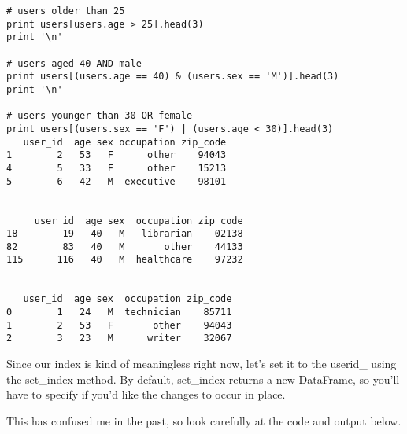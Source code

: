 \documentclass[]{article}
\begin{document}
\begin{framed}
\begin{verbatim}
# users older than 25
print users[users.age > 25].head(3)
print '\n'

# users aged 40 AND male
print users[(users.age == 40) & (users.sex == 'M')].head(3)
print '\n'

# users younger than 30 OR female
print users[(users.sex == 'F') | (users.age < 30)].head(3)
   user_id  age sex occupation zip_code
1        2   53   F      other    94043
4        5   33   F      other    15213
5        6   42   M  executive    98101


     user_id  age sex  occupation zip_code
18        19   40   M   librarian    02138
82        83   40   M       other    44133
115      116   40   M  healthcare    97232


   user_id  age sex  occupation zip_code
0        1   24   M  technician    85711
1        2   53   F       other    94043
2        3   23   M      writer    32067
\end{verbatim}
\end{framed}
Since our index is kind of meaningless right now, let's set it to the userid\_ using the set\_index method. By default, set\_index returns a new DataFrame, so you'll have to specify if you'd like the changes to occur in place.

This has confused me in the past, so look carefully at the code and output below.
\end{document}
